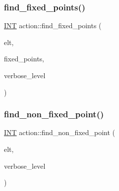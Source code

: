 \subsubsection{\texorpdfstring{find\+\_\+fixed\+\_\+points()}{find\_fixed\_points()}}
{\footnotesize\ttfamily \mbox{\hyperlink{galois_8h_a09fddde158a3a20bd2dcadb609de11dc}{I\+NT}} action\+::find\+\_\+fixed\+\_\+points (\begin{DoxyParamCaption}\item[{void $\ast$}]{elt,  }\item[{\mbox{\hyperlink{galois_8h_a09fddde158a3a20bd2dcadb609de11dc}{I\+NT}} $\ast$}]{fixed\+\_\+points,  }\item[{\mbox{\hyperlink{galois_8h_a09fddde158a3a20bd2dcadb609de11dc}{I\+NT}}}]{verbose\+\_\+level }\end{DoxyParamCaption})}

\mbox{\label{classaction_a7786530b9319ebec531bff2e82f75000}} 
\subsubsection{\texorpdfstring{find\+\_\+non\+\_\+fixed\+\_\+point()}{find\_non\_fixed\_point()}}
{\footnotesize\ttfamily \mbox{\hyperlink{galois_8h_a09fddde158a3a20bd2dcadb609de11dc}{I\+NT}} action\+::find\+\_\+non\+\_\+fixed\+\_\+point (\begin{DoxyParamCaption}\item[{void $\ast$}]{elt,  }\item[{\mbox{\hyperlink{galois_8h_a09fddde158a3a20bd2dcadb609de11dc}{I\+NT}}}]{verbose\+\_\+level }\end{DoxyParamCaption})}

\mbox{\label{classaction_a1b1e49cb857a84db1404f68ac1527fab}} 
